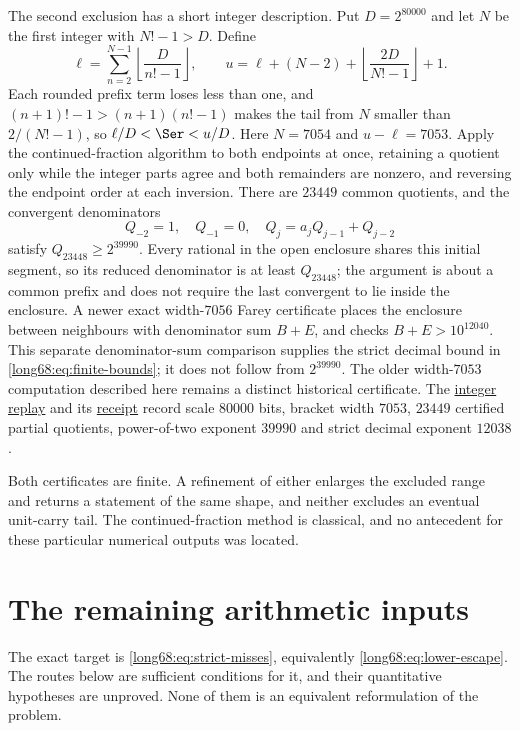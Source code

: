 The second exclusion has a short integer description.  Put $D=2^{80000}$ and
let $N$ be the first integer with $N!-1>D$.  Define
\[
 \ell=\sum_{n=2}^{N-1}\left\lfloor\frac D{n!-1}\right\rfloor,
 \qquad
 u=\ell+(N-2)+\left\lfloor\frac{2D}{N!-1}\right\rfloor+1 .
\]
Each rounded prefix term loses less than one, and $(n+1)!-1>(n+1)(n!-1)$
makes the tail from $N$ smaller than $2/(N!-1)$, so $\ell/D<\Ser<u/D$.  Here
$N=7054$ and $u-\ell=7053$.  Apply the continued-fraction algorithm to both
endpoints at once, retaining a quotient only while the integer parts agree
and both remainders are nonzero, and reversing the endpoint order at each
inversion.  There are $23449$ common quotients, and the convergent
denominators
\[
 Q_{-2}=1,\quad Q_{-1}=0,\quad Q_j=a_jQ_{j-1}+Q_{j-2}
\]
satisfy $Q_{23448}\ge2^{39990}$.  Every rational in the open enclosure shares
this initial segment, so its reduced denominator is at least $Q_{23448}$; the
argument is about a common prefix and does not require the last convergent to
lie inside the enclosure.  A newer exact width-$7056$ Farey certificate places
the enclosure between neighbours with denominator sum $B+E$, and checks
$B+E>10^{12040}$.  This separate denominator-sum comparison supplies the
strict decimal bound in \eqref{long68:eq:finite-bounds}; it does not follow
from $2^{39990}$.  The older width-$7053$ computation described here remains
a distinct historical certificate.  The
\href{https://github.com/wcook04/plectis-erdos/blob/cd3bd6fe245867a435e15d503ccedd699c5d02e2/scripts/check_erdos68_continued_fraction.py}{integer
replay} and its
\href{https://github.com/wcook04/plectis-erdos/blob/cd3bd6fe245867a435e15d503ccedd699c5d02e2/verification/erdos68-continued-fraction.json}{receipt}
record scale $80000$ bits, bracket width $7053$, $23449$ certified partial
quotients, power-of-two exponent $39990$ and strict decimal exponent $12038$.

Both certificates are finite.  A refinement of either enlarges the excluded
range and returns a statement of the same shape, and neither excludes an
eventual unit-carry tail.  The continued-fraction method is classical, and no
antecedent for these particular numerical outputs was located.

\section{The remaining arithmetic inputs}\label{long68:sec:open}

The exact target is \eqref{long68:eq:strict-misses}, equivalently
\eqref{long68:eq:lower-escape}.  The routes below are sufficient conditions for it,
and their quantitative hypotheses are unproved.  None of them is an
equivalent reformulation of the problem.

